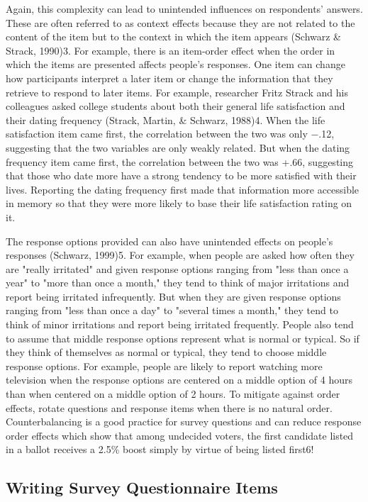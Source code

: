 Again, this complexity can lead to unintended influences on respondents’ answers. These are often referred to as context effects because they are not related to the content of the item but to the context in which the item appears (Schwarz \& Strack, 1990)3. For example, there is an item-order effect when the order in which the items are presented affects people’s responses. One item can change how participants interpret a later item or change the information that they retrieve to respond to later items. For example, researcher Fritz Strack and his colleagues asked college students about both their general life satisfaction and their dating frequency (Strack, Martin, \& Schwarz, 1988)4. When the life satisfaction item came first, the correlation between the two was only −.12, suggesting that the two variables are only weakly related. But when the dating frequency item came first, the correlation between the two was +.66, suggesting that those who date more have a strong tendency to be more satisfied with their lives. Reporting the dating frequency first made that information more accessible in memory so that they were more likely to base their life satisfaction rating on it.

The response options provided can also have unintended effects on people’s responses (Schwarz, 1999)5. For example, when people are asked how often they are "really irritated" and given response options ranging from "less than once a year" to "more than once a month," they tend to think of major irritations and report being irritated infrequently. But when they are given response options ranging from "less than once a day" to "several times a month," they tend to think of minor irritations and report being irritated frequently. People also tend to assume that middle response options represent what is normal or typical. So if they think of themselves as normal or typical, they tend to choose middle response options. For example, people are likely to report watching more television when the response options are centered on a middle option of 4 hours than when centered on a middle option of 2 hours. To mitigate against order effects, rotate questions and response items when there is no natural order. Counterbalancing is a good practice for survey questions and can reduce response order effects which show that among undecided voters, the first candidate listed in a ballot receives a 2.5\% boost simply by virtue of being listed first6!

\subsection{Writing Survey Questionnaire Items}

